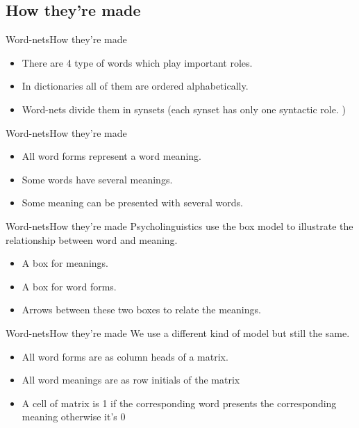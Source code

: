 \documentclass{beamer}
\begin{document}
\subsection{How they're made}

\begin{frame}{Word-nets}{How they're made}
	\begin{itemize}
		\item<1-> {
			There are 4 type of words which play important roles.
		}
		\item<2-> {
			In dictionaries all of them are ordered alphabetically.
		}
		\item<3-> {
			Word-nets divide them in synsets (each synset has only one syntactic role. )
		}
	\end{itemize}
\end{frame}

\begin{frame}{Word-nets}{How they're made}

	\begin{itemize}
		\item<1-> {
				All word forms represent a word meaning.
			}
		\item<2-> {
				Some words have several meanings. 
			}
		\item<3->{
				Some meaning can be presented with several words. 	
			}
	\end{itemize}
\end{frame}

\begin{frame}{Word-nets}{How they're made}
	Psycholinguistics use the box model to illustrate the relationship between word and meaning.  
	\begin{itemize}
		\item<1-> {
				A box for meanings.
			}
		\item<2-> {
				A box for word forms.
			}
		\item<3->{
				Arrows between these two boxes to relate the meanings.
			}
	\end{itemize}
\end{frame}

\begin{frame}{Word-nets}{How they're made}
	We use a different kind of model but still the same.
	\begin{itemize}
		\item<1-> {
				All word forms are as column heads of a matrix.
			}
		\item<2-> {
				All word meanings are as row initials of the matrix
			}
		\item<3->{
				A cell of matrix is 1 if the corresponding word presents the corresponding meaning otherwise it's 0
			}
	\end{itemize}
\end{frame}
\end{document}
